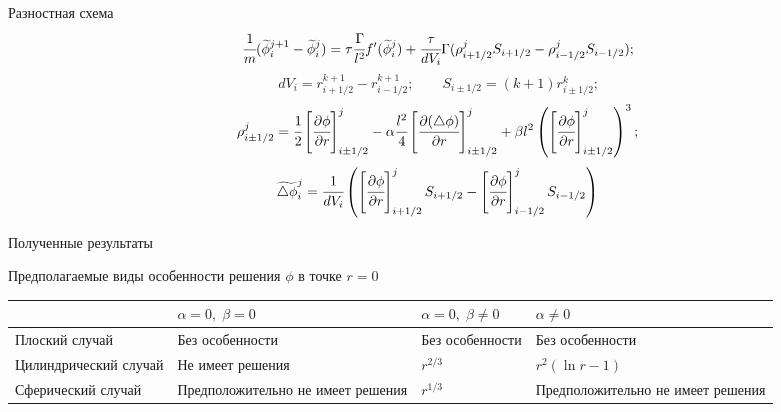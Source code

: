 \documentclass[aspectratio=169]{beamer}
\begin{document}
\begin{frame}{Разностная схема}
$$\cfrac{1}{m} (\widetilde{\phi}_i^{j + 1} - \widetilde{\phi}_i^j) = \tau \cfrac{\Gamma}{l^2}
f'(\widetilde{\phi}_i^j) + \cfrac{\tau}{dV_i} \Gamma (\rho_{i + 1/2}^j S_{i + 1/2} -
\rho_{i - 1/2}^j S_{i - 1/2}) \text{;}$$
$$dV_i = r_{i + 1/2}^{k + 1} - r_{i - 1/2}^{k + 1}; \qquad
S_{i \pm 1/2} = (k + 1) r_{i \pm 1/2}^k \text{;}$$
$$\rho_{i \pm 1/2}^j = \cfrac{1}{2}
\left[ \cfrac{\partial \phi}{\partial r} \right]_{i \pm 1/2}^j -
\alpha \cfrac{l^2}{4} \left[ \cfrac{\partial (\triangle \phi)}{\partial r} \right]_{i \pm 1/2}^j +
\beta l^2 \left( \left[ \cfrac{\partial \phi}{\partial r} \right]_{i \pm 1/2}^j \right)^3
\text{;}$$
$$\widetilde{\triangle \phi}_i^j = \cfrac{1}{dV_i}
\left( \left[ \cfrac{\partial \phi}{\partial r} \right]_{i + 1/2}^j S_{i + 1/2} -
\left[ \cfrac{\partial \phi}{\partial r} \right]_{i - 1/2}^j S_{i - 1/2} \right)$$
\end{frame}


\begin{frame}{Полученные результаты}
\vspace{-1cm}
\begin{center}
	Предполагаемые виды особенности решения $\phi$ в точке $r = 0$
\end{center}
\begin{tabular}{|m{3cm}||m{3.5cm}|m{3.5cm}|m{3.5cm}|}
	\hline
	\vspace*{2mm} \hfill \vspace*{2mm} &\centering $\alpha = 0, \; \beta = 0$ &
	\centering $\alpha = 0, \; \beta \neq 0$ & \centering \arraybackslash $\alpha \neq 0$ \\
	\hline
	\hline
	\vspace{2mm} Плоский \linebreak случай \vspace{2mm} &
	Без особенности & Без особенности & Без особенности \\
	\hline
	\vspace{2mm} Цилиндрический \linebreak случай \vspace{2mm} &
	Не имеет решения & $r^{2/3}$ & $r^2 (\ln r - 1)$ \\
	\hline
	\vspace{2mm} Сферический \linebreak случай \vspace{2mm} &
	Предположительно не имеет решения & $r^{1/3}$ & Предположительно
	не имеет решения \\
	\hline
\end{tabular}
\end{frame}
\end{document}
